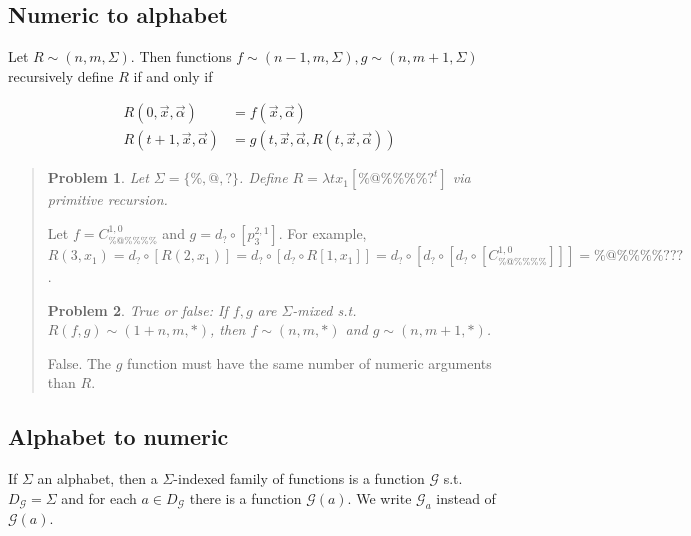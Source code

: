 \documentclass[a4paper, 12pt]{article}
\newtheorem{problem}{Problem}
\newtheorem{problem}{Problem}
\begin{document}
\subsection{Numeric to alphabet}


Let $R \sim (n, m, \Sigma)$. Then functions $f \sim (n - 1, m, \Sigma),  g \sim (n,
m + 1, \Sigma)$ recursively define $R$ if and only if 

\begin{align*}
    R(0, \overrightarrow{x}, \overrightarrow{\alpha}) &= f(\overrightarrow{x},
    \overrightarrow{\alpha}) \\ 
    R(t + 1, \overrightarrow{x}, \overrightarrow{\alpha}) &= g \left(t,
    \overrightarrow{x}, \overrightarrow{\alpha}, R(t, \overrightarrow{x},
\overrightarrow{\alpha})  \right) 
\end{align*}


\small
\begin{quote}

\begin{problem}
    Let $\Sigma = \{\%, @, ?\}$. Define $R = \lambda t x_1 [\% @ \% \% \% \%
    ?^{t}]$ via primitive recursion.
\end{problem}

Let $f = C_{\% @ \% \% \% \%}^{1, 0}$ and $g = d_{?}  \circ \left[ p_{3}^{2, 1}
\right] $. For example, $R(3, x_1) = 
d_? \circ \left[ R(2, x_1)
\right] = d_? \circ  \left[ d_? \circ R[1, x_1] \right] = d_? \circ \left[ d_?
\circ \left[ d_? \circ \left[ C_{\% @ \% \% \% \%}^{1, 0}  \right]  \right]
\right] = \% @ \% \% \% \% ? ? ? $.

\begin{problem}
    True or false: If $f, g$ are $\Sigma$-mixed s.t. $R(f, g) \sim (1 + n, m,
    *)$, then $f \sim (n, m, *)$ and $g \sim (n, m+1, *)$.
\end{problem}

False. The $g$ function must have the same number of numeric arguments than $R$.

\end{quote}
\normalsize


\subsection{Alphabet to numeric}

If $\Sigma$ an alphabet, then a $\Sigma$-indexed family of functions is a
function $\mathcal{G}$ s.t. $D_{\mathcal{G}} = \Sigma$ and for each $a \in
D_{\mathcal{G}}$ there is a function $\mathcal{G}(a)$. We write $\mathcal{G}_a$
instead of $\mathcal{G}(a)$.
\end{document}
